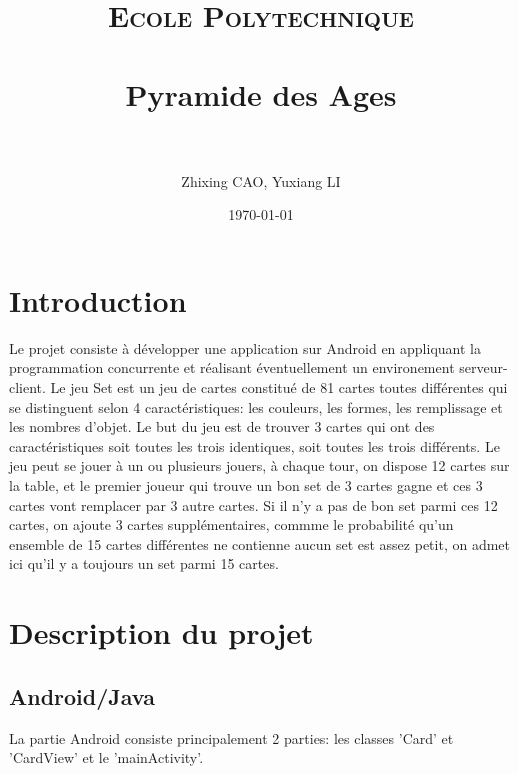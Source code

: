 \documentclass[paper=a4, french]{scrartcl} %
\title{	
\normalfont \normalsize 
\textsc{Ecole Polytechnique} \\ [25pt] %
\horrule{0.5pt} \\[0.4cm] %
\huge Pyramide des Ages \\ %
\horrule{2pt} \\[0.5cm] %
}
\author{Zhixing CAO, Yuxiang LI} %
\date{\normalsize\today} %
\numberwithin{equation}{section} %
\numberwithin{figure}{section} %
\numberwithin{table}{section} %
\begin{document}
\setlength\parindent{12pt}

\maketitle %



\section{Introduction}

Le projet consiste à développer une application sur Android en appliquant la programmation concurrente et réalisant éventuellement un environement serveur-client. Le jeu Set est un jeu de cartes constitué de 81 cartes toutes différentes qui se distinguent selon 4 caractéristiques: les couleurs, les formes, les remplissage et les nombres d'objet. Le but du jeu est de trouver 3 cartes qui ont des caractéristiques soit toutes les trois identiques, soit toutes les trois différents. Le jeu peut se jouer à un ou plusieurs jouers, à chaque tour, on dispose 12 cartes sur la table, et le premier joueur qui trouve un bon set de 3 cartes gagne et ces 3 cartes vont remplacer par 3 autre cartes. Si il n'y a pas de bon set parmi ces 12 cartes, on ajoute 3 cartes supplémentaires, commme le probabilité qu'un ensemble de 15 cartes différentes ne contienne aucun set est assez petit, on admet ici qu'il y a toujours un set parmi 15 cartes.


\section{Description du projet}

	\subsection{Android/Java}

La partie Android consiste principalement 2 parties: les classes 'Card' et 'CardView' et le 'mainActivity'.
\end{document}

